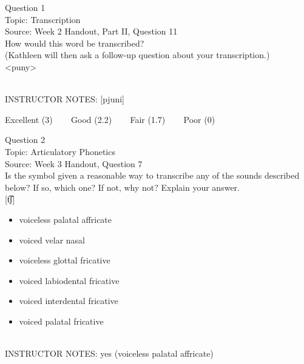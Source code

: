 \documentclass[12pt]{article}
\begin{document}
\begin{center}
\textbf{{\color{blue}{\HUGE START OF EXAM\\}}}

\textbf{{\color{blue}{\HUGE Student ID: 45248\\}}}

\textbf{{\color{blue}{\HUGE \\}}}

\end{center}
\newpage

{\large Question 1}\\

Topic: Transcription\\
Source: Week 2 Handout, Part II, Question 11\\

How would this word be transcribed?\\ (Kathleen will then ask a follow-up question about your transcription.)\\

<puny>


~\\
INSTRUCTOR NOTES: [pjuni]


\vfill
Excellent (3) ~~~ Good (2.2) ~~~ Fair (1.7) ~~~ Poor (0)
\newpage

{\large Question 2}\\

Topic: Articulatory Phonetics\\
Source: Week 3 Handout, Question 7\\

Is the symbol given a reasonable way to transcribe any of the sounds described below? If so, which one? If not, why not? Explain your answer.\\

{[t͡ʃ]}

\begin{itemize} \item voiceless palatal affricate \item voiced velar nasal \item voiceless glottal fricative \item voiced labiodental fricative \item voiced interdental fricative \item voiced palatal fricative \end{itemize}


~\\
INSTRUCTOR NOTES: yes (voiceless palatal affricate)
\end{document}
